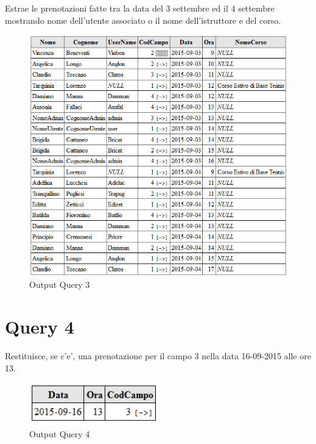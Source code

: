 Estrae le prenotazioni fatte tra la data del 3 settembre ed il 4 settembre mostrando nome dell'utente associato o il nome dell'istruttore e del corso.\\



\begin{figure}[H]
 \centering
  \includegraphics[width=\textwidth]{images/Query3.PNG}
\caption{Output Query 3}
\end{figure}

\newpage
\section{Query 4}
Restituisce, se c'e', una prenotazione per il campo 3 nella data 16-09-2015 alle ore 13.\\



\begin{figure}[H]
 \centering
  \includegraphics[width=0.5\textwidth, height= 5em]{images/Query4.PNG}
\caption{Output Query 4}
\end{figure}

